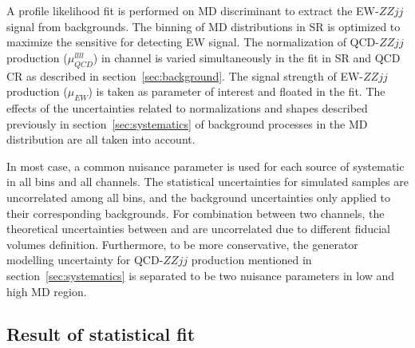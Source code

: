 A profile likelihood fit is performed on MD discriminant to extract the EW-$ZZjj$ signal from backgrounds.
The binning of MD distributions in SR is optimized to maximize the sensitive for detecting EW signal.
The normalization of QCD-$ZZjj$ production ($\mu_{QCD}^{llll}$) in \llll channel is varied simultaneously in the fit in SR and QCD CR as described in section~\ref{sec:background}.
The signal strength of EW-$ZZjj$ production ($\mu_{EW}$) is taken as parameter of interest and floated in the fit.
The effects of the uncertainties related to normalizations and shapes described previously in section~\ref{sec:systematics} 
of background processes in the MD distribution are all taken into account.

In most case, a common nuisance parameter is used for each source of systematic in all bins and all channels.
The statistical uncertainties for simulated samples are uncorrelated among all bins, and the background uncertainties only applied to their corresponding backgrounds.
For combination between two channels, the theoretical uncertainties between \llll and \llvv are uncorrelated due to different fiducial volumes definition.
Furthermore, to be more conservative, the generator modelling uncertainty for QCD-$ZZjj$ production mentioned in section~\ref{sec:systematics}
is separated to be two nuisance parameters in low and high MD region.

\subsection{Result of statistical fit}

